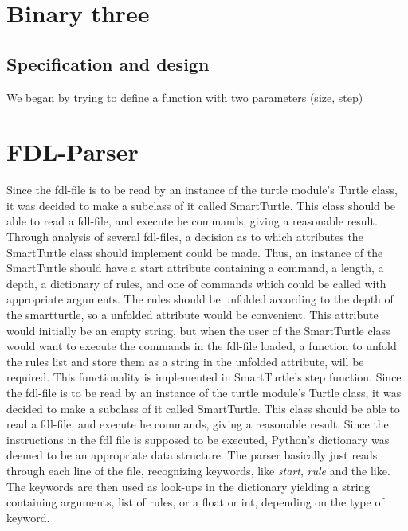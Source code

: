 \documentclass[titlepage]{article}
\begin{document}
\section{Binary three}
\subsection{Specification and design}
We began by trying to define a function with two parameters (size, step)
\section{FDL-Parser}
Since the fdl-file is to be read by an instance of the turtle module's Turtle class, it was decided to make a subclass of it called SmartTurtle. This class should be able to read a fdl-file, and execute he commands, giving a reasonable result. Through analysis of several fdl-files, a decision as to which attributes the SmartTurtle class should implement could be made. Thus, an instance of the SmartTurtle should have a start attribute containing a command, a length, a depth, a dictionary of rules, and one of commands which could be called with appropriate arguments. The rules should be unfolded according to the depth of the smartturtle, so a unfolded attribute would be convenient. This attribute would initially be an empty string, but when the user of the SmartTurtle class would want to execute the commands in the fdl-file loaded, a function to unfold the rules list and store them as a string in the unfolded attribute, will be required. This functionality is implemented in SmartTurtle's step function.
Since the fdl-file is to be read by an instance of the turtle module's Turtle class, it was decided to make a subclass of it called SmartTurtle. This class should be able to read a fdl-file, and execute he commands, giving a reasonable result. 
Since the instructions in the fdl file is supposed to be executed, Python's dictionary was deemed to be an appropriate data structure. The parser basically just reads through each line of the file, recognizing keywords, like \textit{start}, \textit{rule} and the like. The keywords are then used as look-ups in the dictionary yielding a string containing arguments, list of rules, or a float or int, depending on the type of keyword. 
\end{document}
